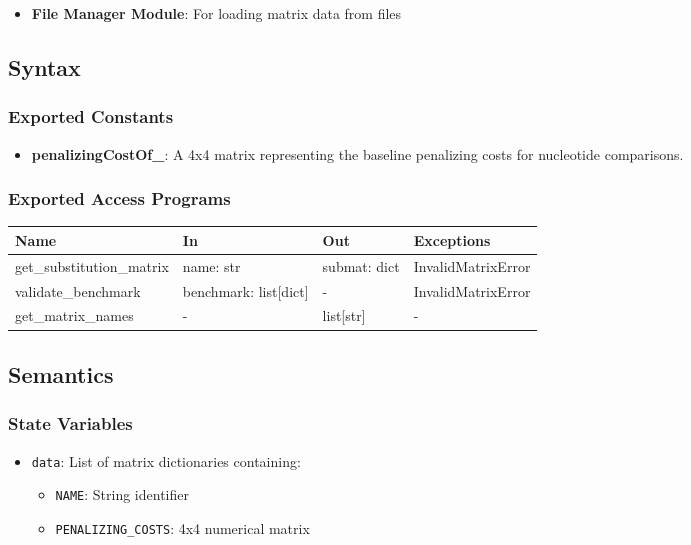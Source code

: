 \documentclass[12pt, titlepage]{article}
\begin{document}
\begin{itemize}
    \item \textbf{File Manager Module}: For loading matrix data from files
\end{itemize}

\subsection{Syntax}

\subsubsection{Exported Constants}

\begin{itemize}
    \item \textbf{penalizingCostOf\_}: A 4x4 matrix representing the baseline penalizing costs for nucleotide comparisons.
\end{itemize}

\subsubsection{Exported Access Programs}

\begin{center}
\begin{tabular}{p{4cm} p{4cm} p{3cm} p{2cm}}
\hline
\textbf{Name} & \textbf{In} & \textbf{Out} & \textbf{Exceptions} \\
\hline
get\_substitution\_matrix & name: str & submat: dict & InvalidMatrixError \\
validate\_benchmark & benchmark: list[dict] & - & InvalidMatrixError \\
get\_matrix\_names & - & list[str] & - \\
\hline
\end{tabular}
\end{center}

\subsection{Semantics}

\subsubsection{State Variables}

\begin{itemize}
    \item \texttt{data}: List of matrix dictionaries containing:
    \begin{itemize}
        \item \texttt{NAME}: String identifier
        \item \texttt{PENALIZING\_COSTS}: 4x4 numerical matrix
    \end{itemize}
\end{itemize}
\end{document}
